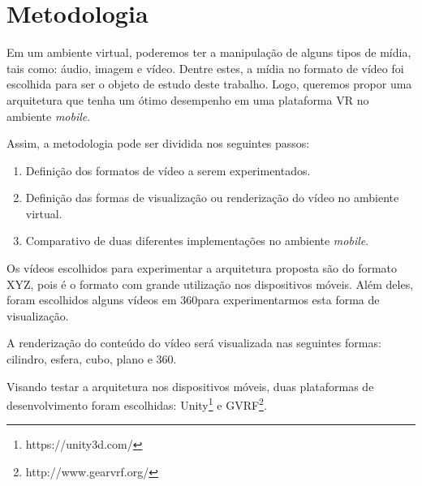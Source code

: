 \section{Metodologia} \label{sec-methodology}


Em um ambiente virtual, poderemos ter a manipulação de alguns tipos de mídia, tais como: áudio, imagem e vídeo. Dentre estes, a mídia no formato de vídeo foi escolhida para ser o objeto de estudo deste trabalho. Logo, queremos propor uma arquitetura que tenha um ótimo desempenho em uma plataforma VR no ambiente \textit{mobile}.

Assim, a metodologia pode ser dividida nos seguintes passos:

\begin{enumerate}
    \item Definição dos formatos de vídeo a serem experimentados.
    \item Definição das formas de visualização ou renderização do vídeo no ambiente virtual.
    \item Comparativo de duas diferentes implementações no ambiente \textit{mobile}.
\end{enumerate}

Os vídeos escolhidos para experimentar a arquitetura proposta são do formato XYZ, pois é o formato com grande utilização nos dispositivos móveis. Além deles, foram escolhidos alguns vídeos em 360\degree para experimentarmos esta forma de visualização.

A renderização do conteúdo do vídeo será visualizada nas seguintes formas: cilindro, esfera, cubo, plano e 360\degree.

Visando testar a arquitetura nos dispositivos móveis, duas plataformas de desenvolvimento foram escolhidas: Unity\footnote{https://unity3d.com/} e GVRF\footnote{http://www.gearvrf.org/}.
